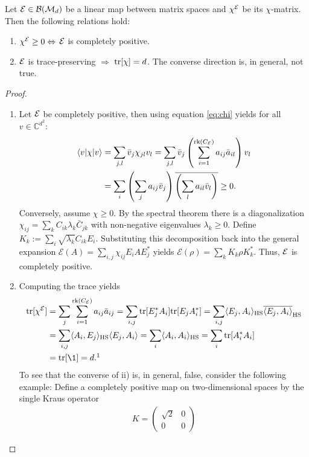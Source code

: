 \begin{prop}
    Let $\mathcal E \in \mathcal B(\mathcal M_d)$ be a linear map between matrix spaces and $\chi^{\mathcal E}$ be its $\chi$-matrix. Then the following relations hold:
    \begin{enumerate}
        \item $\chi^{\mathcal E} \geq 0 \Leftrightarrow$ $\mathcal E$ is completely positive.
        \item $\mathcal E$ is trace-preserving $\Rightarrow$ $\mathrm{tr[\chi]} = d$. The converse direction is, in general, not true.
    \end{enumerate}
\end{prop}
\begin{proof}
\begin{enumerate}
\item Let $\mathcal E$ be completely positive, then using equation \eqref{eq:chi} yields for all $v \in \mathbb{C}^{d^2}$:
\begin{align*}
    \langle v\rvert \chi \lvert v\rangle   &= \sum_{j,l} \bar{v}_j \chi_{jl} v_l 
    = \sum_{j,l} \bar{v}_j \left( \sum_{i=1}^{\text{rk}(C_{\mathcal E})} a_{ij} \bar{a}_{il} \right) v_l \\
    &= \sum_i \left( \sum_j a_{ij} \bar{v}_j \right) \overline{\left( \sum_l {a}_{il} \bar{v}_l \right) }\geq 0.
\end{align*}
Conversely, assume $\chi \ge 0$. By the spectral theorem there is a diagonalization $\chi_{ij} = \sum_k C_{ik} \lambda_k \bar{C}_{jk}$ with non-negative eigenvalues $\lambda_k \ge 0$. Define $K_k := \sum_i \sqrt{\lambda_k} C_{ik} E_i$. Substituting this decomposition back into the general expansion $\mathcal{E}(A) = \sum_{i,j} \chi_{ij} E_i A E_j^*$ yields $
    \mathcal{E}(\rho) = \sum_k K_k \rho K_k^*$. Thus, $\mathcal E$ is completely positive.
\item 
Computing the trace yields
\begin{align*}
    \text{tr}[\chi^{\m E}] &= \sum_j \sum_{i=1}^{\rk(C_{\m E})} a_{ij} \bar{a}_{ij} = \sum_{i,j} \text{tr}[E_j^* A_i] \text{tr}[E_j A_i^*] = \sum_{i,j} \langle E_j, A_i \rangle_\text{HS} \overline{\langle E_j, A_i \rangle}_\text{HS} \\
    &= \sum_{i,j} \langle A_i, E_j \rangle_\text{HS} \langle E_j, A_i \rangle = \sum_i \langle A_i, A_i \rangle_\text{HS} = \sum_i \text{tr}[A_i^* A_i] \quad \\
    &= \text{tr}[\1] = d.\footnotemark
\end{align*}
To see that the converse of ii) is, in general, false, consider the following example: Define a completely positive map on two-dimensional spaces by the single Kraus operator 
\begin{align*}
K = \begin{pmatrix} \sqrt{2} & 0 \\ 0 & 0 \end{pmatrix}
\end{align*}


\end{enumerate}
\end{proof}
